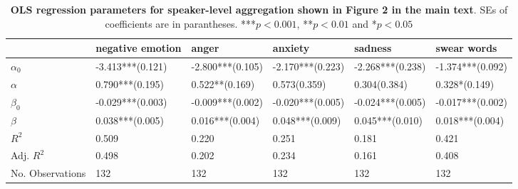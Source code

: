 \begin{table}[h]\centering
\caption{\textbf{OLS regression parameters for  speaker-level aggregation shown in Figure 2 in the main text}. SEs of coefficients are in parantheses. ***$p < 0.001$, **$p < 0.01$ and *$p < 0.05$}
	\label{fig: Speaker_1}
\begin{adjustbox}{width=\linewidth, center}
	\begin{tabular}{llllll}
	\toprule
	{} &            negative emotion &                                 anger &                                                   anxiety &                                                   sadness &                                     swear words \\
	\midrule
	$\alpha_0$       &            -3.413***(0.121) &                      -2.800***(0.105) &                                          -2.170***(0.223) &                                          -2.268***(0.238) &                                -1.374***(0.092) \\
	$\alpha$         &  \phantom{-}0.790***(0.195) &  \phantom{-}0.522**\phantom{*}(0.169) &  \phantom{-}0.573\phantom{*}\phantom{*}\phantom{*}(0.359) &  \phantom{-}0.304\phantom{*}\phantom{*}\phantom{*}(0.384) &  \phantom{-}0.328*\phantom{*}\phantom{*}(0.149) \\
	$\beta_0$        &            -0.029***(0.003) &                      -0.009***(0.002) &                                          -0.020***(0.005) &                                          -0.024***(0.005) &                                -0.017***(0.002) \\
	$\beta$          &  \phantom{-}0.038***(0.005) &            \phantom{-}0.016***(0.004) &                                \phantom{-}0.048***(0.009) &                                \phantom{-}0.045***(0.010) &                      \phantom{-}0.018***(0.004) \\
	$R^2$            &                       0.509 &                                 0.220 &                                                     0.251 &                                                     0.181 &                                           0.421 \\
	Adj. $R^2$       &                       0.498 &                                 0.202 &                                                     0.234 &                                                     0.161 &                                           0.408 \\
	No. Observations &                         132 &                                   132 &                                                       132 &                                                       132 &                                             132 \\
	\bottomrule
	\end{tabular}
	
\end{adjustbox}
	\end{table}

